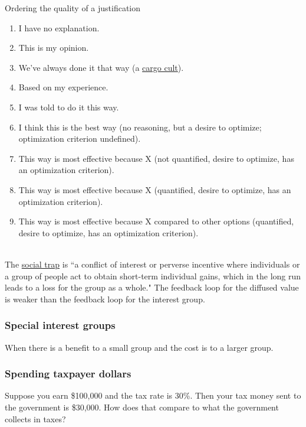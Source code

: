 Ordering the quality of a justification
\begin{enumerate}
    \item I have no explanation.
    \item This is my opinion.
    \item We've always done it that way (a \href{https://en.wikipedia.org/wiki/Cargo_cult}{cargo cult}).
    \item Based on my experience.
    \item I was told to do it this way.
    \item I think this is the best way (no reasoning, but a desire to optimize; optimization criterion undefined).
    \item This way is most effective because X (not quantified, desire to optimize, has an optimization criterion).
    \item This way is most effective because X (quantified, desire to optimize, has an optimization criterion).
    \item This way is most effective because X compared to other options (quantified, desire to optimize, has an optimization criterion).
\end{enumerate}


\ \\


The \href{https://en.wikipedia.org/wiki/Social_trap}{social trap} is ``a conflict of interest or perverse incentive where individuals or a group of people act to obtain short-term individual gains, which in the long run leads to a loss for the group as a whole."
The feedback loop for the diffused value is weaker than the feedback loop for the interest group. 

\subsubsection{Special interest groups}

When there is a benefit to a small group and the cost is to a larger group.

\subsubsection{Spending taxpayer dollars}

Suppose you earn \$100,000 and the tax rate is 30\%. Then your tax money sent to the government is \$30,000.
How does that compare to what the government collects in taxes?

